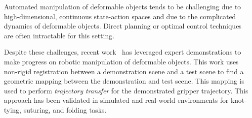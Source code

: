 \documentclass[conference]{IEEEtran}
\begin{document}
\maketitle



Automated manipulation of deformable objects tends to be challenging
due to high-dimensional, continuous state-action spaces and due to the
complicated dynamics of deformable objects. Direct planning or optimal
control techniques are often intractable for this setting.

Despite these challenges, recent work~\cite{Schulmanetal_IROS2013,
  Schulmanetal_ISRR2013} has leveraged expert demonstrations to make
progress on robotic manipulation of deformable objects. This work uses
non-rigid registration between a demonstration scene and a test scene
to find a geometric mapping between the demonstration and test scene.
This mapping is used to perform \emph{trajectory transfer} for the
demonstrated gripper trajectory. This approach has been validated in
simulated and real-world environments for knot-tying, suturing, and
folding tasks.
\end{document}
